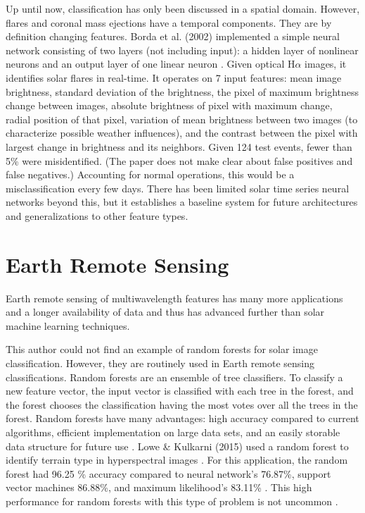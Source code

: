 \documentclass[twoside]{report}
\begin{document}
Up until now, classification has only been discussed in a spatial domain. However, flares and coronal mass ejections have a temporal components. They are by definition changing features. Borda et al. (2002) implemented a simple neural network consisting of two layers (not including input): a hidden layer of nonlinear neurons and
an output layer of one linear neuron \cite{borda2002automatic}. Given optical H$\alpha$ images, it identifies solar flares in real-time. It operates on 7 input features: mean image brightness, standard deviation of the brightness, the pixel of maximum brightness change between images, absolute brightness of pixel with maximum change, radial position of that pixel, variation of mean brightness between two images (to characterize possible weather influences), and the contrast between the pixel with largest change in brightness and its neighbors. Given 124 test events, fewer than 5\% were misidentified. (The paper does not make clear about false positives and false negatives.) Accounting for normal operations, this would be a misclassification every few days. There has been limited solar time series neural networks beyond this, but it establishes a baseline system for future architectures and generalizations to other feature types.

\section{Earth Remote Sensing}
Earth remote sensing of multiwavelength features has many more applications and a longer availability of data and thus has advanced further than solar machine learning techniques. 

This author could not find an example of random forests for solar image classification. However, they are routinely used in Earth remote sensing classifications. Random forests are an ensemble of tree classifiers. To classify a new feature vector, the input vector is classified with each tree in the forest, and the forest chooses the classification having the most votes over all the trees in the forest. Random forests have many advantages: high accuracy compared to current algorithms, efficient implementation on large data
sets, and an easily storable data structure for future use \cite{ghose2010decision}. Lowe \& Kulkarni (2015) used a random forest to identify terrain type in hyperspectral images \cite{lowe:2015}. For this application, the random forest had 96.25 \% accuracy compared to neural network's 76.87\%, support vector machines 86.88\%, and maximum likelihood's 83.11\% \cite{lowe:2015}. This high performance for random forests with this type of problem is not uncommon \cite{puissant2014object, salas2016multispectral, clark2016mapping, kulkarni2017multispectral}.
\end{document}
